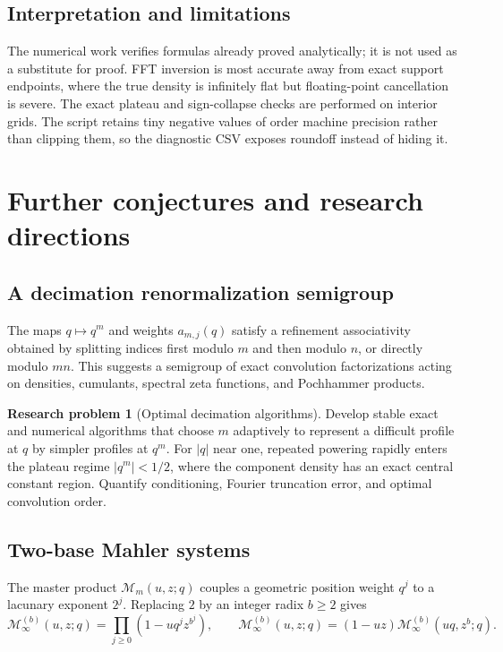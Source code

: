\documentclass[11pt,oneside]{article}
\theoremstyle{definition}
\newtheorem{problem}[theorem]{Research problem}
\theoremstyle{remark}
\begin{document}
\subsection{Interpretation and limitations}
The numerical work verifies formulas already proved analytically; it is not
used as a substitute for proof.  FFT inversion is most accurate away from exact
support endpoints, where the true density is infinitely flat but floating-point
cancellation is severe.  The exact plateau and sign-collapse checks are
performed on interior grids.  The script retains tiny negative values of order
machine precision rather than clipping them, so the diagnostic CSV exposes
roundoff instead of hiding it.

\section{Further conjectures and research directions}

\subsection{A decimation renormalization semigroup}
The maps \(q\mapsto q^m\) and weights \(a_{m,j}(q)\) satisfy a refinement
associativity obtained by splitting indices first modulo \(m\) and then modulo
\(n\), or directly modulo \(mn\).  This suggests a semigroup of exact
convolution factorizations acting on densities, cumulants, spectral zeta
functions, and Pochhammer products.

\begin{problem}[Optimal decimation algorithms]
Develop stable exact and numerical algorithms that choose \(m\) adaptively to
represent a difficult profile at \(q\) by simpler profiles at \(q^m\).  For
\(|q|\) near one, repeated powering rapidly enters the plateau regime
\(|q^m|<1/2\), where the component density has an exact central constant region.
Quantify conditioning, Fourier truncation error, and optimal convolution order.
\end{problem}

\subsection{Two-base Mahler systems}
The master product \(\mathcal M_m(u,z;q)\) couples a geometric position weight
\(q^j\) to a lacunary exponent \(2^j\).  Replacing \(2\) by an integer radix
\(b\ge2\) gives
\[
 \mathcal M_\infty^{(b)}(u,z;q)
 =\prod_{j\ge0}(1-uq^jz^{b^j}),
 \qquad
 \mathcal M_\infty^{(b)}(u,z;q)
 =(1-uz)\mathcal M_\infty^{(b)}(uq,z^b;q).
\]
\end{document}
